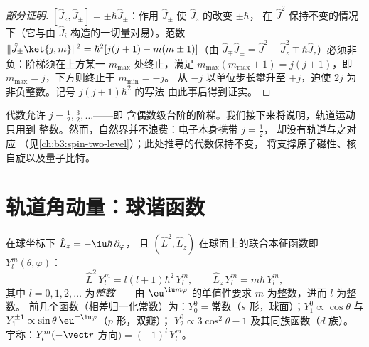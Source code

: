\begin{proof}[部分证明]
$[\hat J_z, \hat J_\pm] = \pm\hbar\hat J_\pm$：作用 $\hat
J_\pm$ 使 $\hat J_z$ 的改变 $\pm\hbar$，
在 $\hat J^2$ 保持不变的情况下（它与由 $\hat
J_i$ 构造的一切量对易）。范数 $\|\hat J_\pm\ket{j,m}\|^2 = \hbar^2[j(j+1) -
m(m\pm1)]$（由 $\hat J_\mp\hat J_\pm = \hat J^2 - \hat
J_z^2 \mp \hbar\hat J_z$）必须非负：阶梯须在上方某一
$m_{\max}$ 处终止，满足 $m_{\max}(m_{\max}+1) =
j(j+1)$，即 $m_{\max} = j$，下方则终止于 $m_{\min} = -j$。
从 $-j$ 以单位步长攀升至 $+j$，迫使 $2j$
为非负整数。记号 $j(j+1)\hbar^2$ 的写法
由此事后得到证实。
\end{proof}

\begin{remark}[目录中的空位]\label{rem:b3:quantum-angular-momentum:halfinteger}
代数允许 $j = \tfrac12, \tfrac32, \dots$——即
含偶数级台阶的阶梯。我们接下来将说明，轨道运动只用到
整数。然而，自然界并不浪费：电子本身携带 $j = \tfrac12$，
却没有轨道与之对应
（见\cref{ch:b3:spin-two-level}）；此处推导的代数保持不变，
将支撑原子磁性、核自旋以及量子比特。
\end{remark}

\section{轨道角动量：球谐函数}

\begin{proposition}[球谐函数]\label{prop:b3:quantum-angular-momentum:harmonics}
在球坐标下 $\hat L_z = -\iu\hbar\,\partial_\varphi$，
且 $(\hat L^2, \hat L_z)$ 在球面上的联合本征函数即
\emph{} $Y_l^m(\theta, \varphi)$：
\[
\hat L^2\,Y_l^m = l(l+1)\hbar^2\,Y_l^m , \qquad
\hat L_z\,Y_l^m = m\hbar\,Y_l^m ,
\]
其中 $l = 0, 1, 2, \dots$ 为\emph{整数}——由
$\eu^{\iu m\varphi}$ 的单值性要求 $m$ 为整数，进而 $l$ 为整数。
前几个函数（相差归一化常数）为：$Y_0^0 = \text{常数}$（$s$
形，球面）；$Y_1^0 \propto \cos\theta$ 与 $Y_1^{\pm1}
\propto \sin\theta\,\eu^{\pm\iu\varphi}$（$p$ 形，双瓣）；
$Y_2^0 \propto 3\cos^2\theta - 1$ 及其同族函数（$d$ 族）。
宇称：$Y_l^m(-\vect r$ 方向$) = (-1)^l\,Y_l^m$。
\end{proposition}
\admitted

